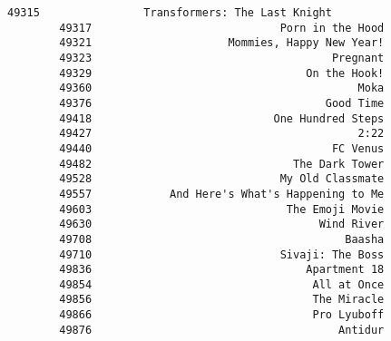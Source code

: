 \documentclass[11pt]{article}
\begin{document}
\begin{Verbatim}[commandchars=\\\{\}]
        49315                Transformers: The Last Knight   
        49317                             Porn in the Hood   
        49321                     Mommies, Happy New Year!   
        49323                                     Pregnant   
        49329                                 On the Hook!   
        49360                                         Moka   
        49376                                    Good Time   
        49418                            One Hundred Steps   
        49427                                         2:22   
        49440                                     FC Venus   
        49482                               The Dark Tower   
        49528                             My Old Classmate   
        49557            And Here's What's Happening to Me   
        49603                              The Emoji Movie   
        49630                                   Wind River   
        49708                                       Baasha   
        49710                             Sivaji: The Boss   
        49836                                 Apartment 18   
        49854                                  All at Once   
        49856                                  The Miracle   
        49866                                  Pro Lyuboff   
        49876                                      Antidur   
        

\end{Verbatim}
\end{document}
